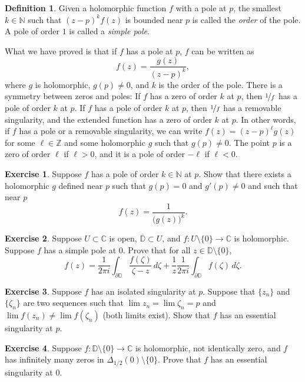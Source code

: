 \documentclass[12pt,openany]{book}
\newcommand{\C}{{\mathbb{C}}}
\newcommand{\Z}{{\mathbb{Z}}}
\newcommand{\N}{{\mathbb{N}}}
\newcommand{\D}{{\mathbb{D}}}
\newcommand{\myindex}[1]{#1\index{#1}}
\theoremstyle{plain}
\theoremstyle{remark}
\theoremstyle{definition}
\newtheorem{defn}[thm]{Definition}
\newenvironment{exbox}{%
    \def\FrameCommand{\vrule width 1pt \relax\hspace{10pt}}%
    \MakeFramed{\advance\hsize-\width\FrameRestore}%
}{%
    \endMakeFramed
}
\theoremstyle{exercise}
\newtheorem{exercise}{Exercise}[section]
\theoremstyle{example}
\begin{document}
\begin{defn}
Given a holomorphic function $f$ with a pole at $p$, the smallest $k \in \N$
such that ${(z-p)}^k f(z)$ is bounded near $p$ is called the
\emph{order} of the pole.
A pole of order $1$ is called a \emph{\myindex{simple pole}}.
\end{defn}

What we have proved is that if $f$
has a pole at $p$, $f$ can be written as
\begin{equation*}
f(z) = \frac{g(z)}{{(z-p)}^k} ,
\end{equation*}
where $g$ is holomorphic, $g(p) \not= 0$, and $k$ is the order of the pole.
There is a symmetry between zeros and poles:
If $f$ has a zero of order $k$ at $p$, then $\nicefrac{1}{f}$ has a pole of
order $k$ at $p$.
If $f$ has a pole of order $k$ at $p$, then $\nicefrac{1}{f}$
has a removable singularity, and the extended function has a zero of order
$k$ at $p$.
In other words, if $f$ has a pole or a removable singularity, we can write
$f(z) = {(z-p)}^\ell g(z)$ for some $\ell \in \Z$ and some holomorphic $g$ such
that $g(p) \not= 0$.
The point $p$ is a zero of order $\ell$ if $\ell
> 0$, and it is a pole of order $-\ell$ if $\ell < 0$.

\begin{exbox}
\begin{exercise}
Suppose $f$ has a pole of order $k \in \N$ at $p$.
Show that there exists a holomorphic $g$ defined near $p$
such that $g(p) = 0$ and $g'(p) \not= 0$ and such that near $p$
\begin{equation*}
f(z) = \frac{1}{{\bigl(g(z)\bigr)}^k} .
\end{equation*}
\end{exercise}

\begin{exercise}
Suppose $U \subset \C$ is open, $\overline{\D} \subset U$,
and $f \colon U \setminus \{0\} \to \C$ is holomorphic.
Suppose $f$ has a simple pole at $0$.  Prove that for all
$z \in \D \setminus \{ 0 \}$,
\begin{equation*}
f(z) =
\frac{1}{2\pi i} \int_{\partial \D}
\frac{f(\zeta)}{\zeta-z} \, d\zeta
+
\frac{1}{z}
\frac{1}{2\pi i} \int_{\partial \D}
f(\zeta) \, d\zeta .
\end{equation*}
\end{exercise}

\begin{exercise}
Suppose $f$ has an isolated singularity at $p$.  Suppose that
$\{ z_n \}$ and $\{ \zeta_n \}$ are two sequences such that
$\lim z_n = \lim \zeta_n = p$ and $\lim f(z_n) \not= \lim f(\zeta_n)$
(both limits exist).
Show that $f$ has an essential singularity at $p$.
\end{exercise}

\begin{exercise}
Suppose $f \colon \D \setminus \{0\} \to \C$ is holomorphic,
not identically zero, and
$f$ has infinitely many zeros in $\Delta_{1/2}(0) \setminus \{ 0 \}$.
Prove that $f$ has an essential singularity at $0$.
\end{exercise}
\end{exbox}
\end{document}
